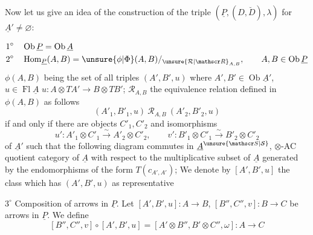 Now let us give an idea of the construction of the triple $(\underline P,(D,\breve D),\lambda)$ for $\underline A'\ne\varnothing$:

\[
\begin{aligned}
1^\circ\quad &\operatorname{Ob}\underline P=\operatorname{Ob}\underline A\\
2^\circ\quad &\operatorname{Hom}_{\underline P}(A,B)=\unsure{\phi|\Phi}(A,B)/_{\unsure{\mathcal R|\mathscr R}_{A,B}},\qquad A,B\in\operatorname{Ob}\underline P
\end{aligned}
\]
$\phi(A,B)$ being the set of all triples $(A',B',u)$ where $A',B'\in\operatorname{Ob}\underline A'$, $u\in\operatorname{Fl}\underline A$ $u:A\otimes TA'\longrightarrow B\otimes TB'$; $\mathcal R_{A,B}$ the equivalence relation defined in $\phi(A,B)$ as follows
\[
(A'_1,B'_1,u)\ \mathcal R_{A,B}\ (A'_2,B'_2,u)
\]
if and only if there are objects $C'_1,C'_2$ and isomorphisms
\[
u':A'_1\otimes C'_1\xrightarrow{\sim}A'_2\otimes C'_2,\qquad v':B'_1\otimes C'_1\xrightarrow{\sim}B'_2\otimes C'_2
\]
of $\underline A'$ such that the following diagram commutes in $\underline A^{\unsure{\mathscr S|\mathcal S}}$, $\otimes$-AC quotient category of $\underline A$ with respect to the multiplicative subset of $\underline A$ generated by the endomorphisms of the form $T(c_{A',A'})$;
We denote by $[A',B',u]$ the class which has $(A',B',u)$ as representative

$3^\circ$ Composition of arrows in $\underline P$. Let $[A',B',u]:A\to B$, $[B'',C'',v]:B\to C$ be arrows in $\underline P$. We define
\[
[B'',C'',v]\circ[A',B',u]=[A'\otimes B'',B'\otimes C'',\omega]:A\longrightarrow C
\]
